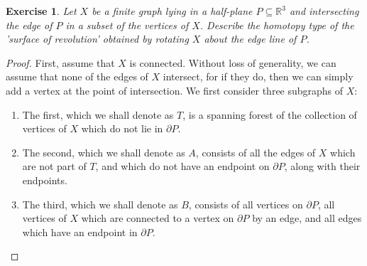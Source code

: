 \documentclass{article}
\newtheorem{exercise}[theorem]{Exercise}
\begin{document}
\begin{exercise}
Let $X$ be a finite graph lying in a half-plane $P\subseteq \mathbb{R}^3$ and intersecting the edge of $P$ in a subset of the vertices of $X$. Describe the homotopy type of the 'surface of revolution' obtained by rotating $X$ about the edge line of $P$.
\end{exercise}
\begin{proof}
First, assume that $X$ is connected. Without loss of generality, we can assume that none of the edges of $X$ intersect, for if they do, then we can simply add a vertex at the point of intersection. We first consider three subgraphs of $X$:
\begin{enumerate}
\item The first, which we shall denote as $T$, is a spanning forest of the collection of vertices of $X$ which do not lie in $\partial P$.
\item The second, which we shall denote as $A$, consists of all the edges of $X$ which are not part of $T$, and which do not have an endpoint on $\partial P$, along with their endpoints.
\item The third, which we shall denote as $B$, consists of all vertices on $\partial P$, all vertices of $X$ which are connected to a vertex on $\partial P$ by an edge, and all edges which have an endpoint in $\partial P$.

\end{enumerate}
\end{proof}
\end{document}
